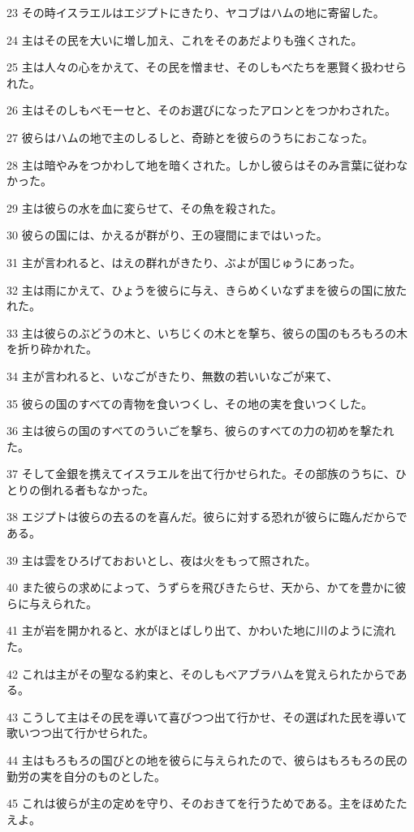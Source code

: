 \par 23 その時イスラエルはエジプトにきたり、ヤコブはハムの地に寄留した。
\par 24 主はその民を大いに増し加え、これをそのあだよりも強くされた。
\par 25 主は人々の心をかえて、その民を憎ませ、そのしもべたちを悪賢く扱わせられた。
\par 26 主はそのしもべモーセと、そのお選びになったアロンとをつかわされた。
\par 27 彼らはハムの地で主のしるしと、奇跡とを彼らのうちにおこなった。
\par 28 主は暗やみをつかわして地を暗くされた。しかし彼らはそのみ言葉に従わなかった。
\par 29 主は彼らの水を血に変らせて、その魚を殺された。
\par 30 彼らの国には、かえるが群がり、王の寝間にまではいった。
\par 31 主が言われると、はえの群れがきたり、ぶよが国じゅうにあった。
\par 32 主は雨にかえて、ひょうを彼らに与え、きらめくいなずまを彼らの国に放たれた。
\par 33 主は彼らのぶどうの木と、いちじくの木とを撃ち、彼らの国のもろもろの木を折り砕かれた。
\par 34 主が言われると、いなごがきたり、無数の若いいなごが来て、
\par 35 彼らの国のすべての青物を食いつくし、その地の実を食いつくした。
\par 36 主は彼らの国のすべてのういごを撃ち、彼らのすべての力の初めを撃たれた。
\par 37 そして金銀を携えてイスラエルを出て行かせられた。その部族のうちに、ひとりの倒れる者もなかった。
\par 38 エジプトは彼らの去るのを喜んだ。彼らに対する恐れが彼らに臨んだからである。
\par 39 主は雲をひろげておおいとし、夜は火をもって照された。
\par 40 また彼らの求めによって、うずらを飛びきたらせ、天から、かてを豊かに彼らに与えられた。
\par 41 主が岩を開かれると、水がほとばしり出て、かわいた地に川のように流れた。
\par 42 これは主がその聖なる約束と、そのしもべアブラハムを覚えられたからである。
\par 43 こうして主はその民を導いて喜びつつ出て行かせ、その選ばれた民を導いて歌いつつ出て行かせられた。
\par 44 主はもろもろの国びとの地を彼らに与えられたので、彼らはもろもろの民の勤労の実を自分のものとした。
\par 45 これは彼らが主の定めを守り、そのおきてを行うためである。主をほめたたえよ。

